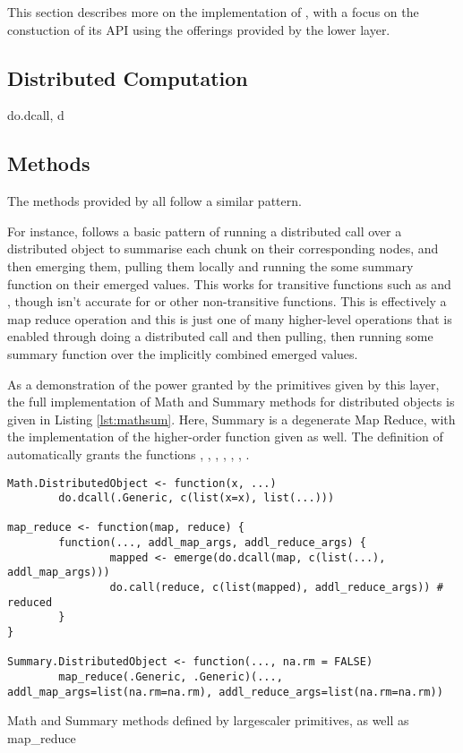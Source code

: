 This section describes more on the implementation of , with a focus on the constuction of its API using the offerings provided by the lower layer.

\subsection{Distributed Computation}

do.dcall, d

\subsection{Methods}

The methods provided by \lsr all follow a similar pattern.

For instance,  follows a basic pattern of running a distributed call over a distributed object to summarise each chunk on their corresponding nodes, and then emerging them, pulling them locally and running the some summary function on their  emerged values.
This works for transitive functions such as  and , though isn't accurate for  or other non-transitive functions.
This is effectively a map reduce operation and this is just one of many higher-level operations that is enabled through doing a distributed call and then pulling, then running some summary function over the implicitly combined emerged values.

As a demonstration of the power granted by the primitives given by this layer, the full implementation of Math and Summary methods for distributed objects is given in Listing \cref{lst:mathsum}.
Here, Summary is a degenerate Map Reduce, with the implementation of the higher-order  function given as well. The definition of  automatically grants the functions , , , , , , . 

\begin{listing}
\begin{verbatim}
Math.DistributedObject <- function(x, ...)
        do.dcall(.Generic, c(list(x=x), list(...)))

map_reduce <- function(map, reduce) {
        function(..., addl_map_args, addl_reduce_args) {
                mapped <- emerge(do.dcall(map, c(list(...), addl_map_args)))
                do.call(reduce, c(list(mapped), addl_reduce_args)) # reduced
        }
}

Summary.DistributedObject <- function(..., na.rm = FALSE)  
        map_reduce(.Generic, .Generic)(..., addl_map_args=list(na.rm=na.rm), addl_reduce_args=list(na.rm=na.rm)) 
\end{verbatim}
\caption{Math and Summary methods defined by largescaler primitives, as well as map\_reduce}
\label{lst:mathsum}
\end{listing}
